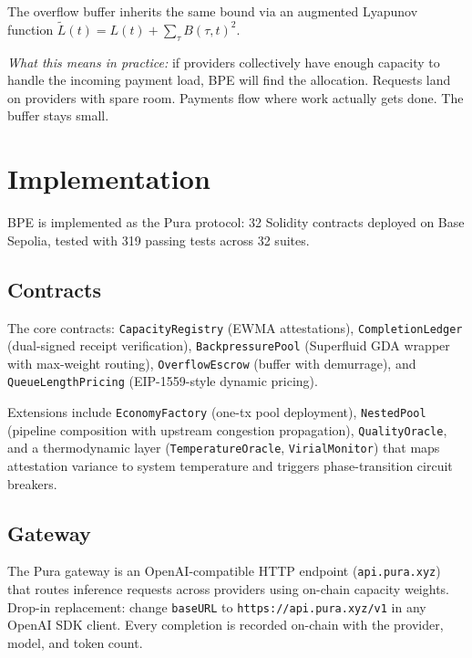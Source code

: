 \documentclass[10pt,twocolumn]{article}
\begin{document}
The overflow buffer inherits the same bound via an augmented Lyapunov function
$\tilde{L}(t) = L(t) + \sum_\tau B(\tau,t)^2$.

\textit{What this means in practice:} if providers collectively have enough
capacity to handle the incoming payment load, BPE will find the allocation.
Requests land on providers with spare room. Payments flow where work actually
gets done. The buffer stays small.


\section{Implementation}

BPE is implemented as the Pura protocol: 32 Solidity contracts deployed on
Base Sepolia, tested with 319 passing tests across 32 suites.

\subsection{Contracts}

The core contracts: \texttt{CapacityRegistry} (EWMA attestations),
\texttt{CompletionLedger} (dual-signed receipt verification),
\texttt{BackpressurePool} (Superfluid GDA wrapper with max-weight routing),
\texttt{OverflowEscrow} (buffer with demurrage), and
\texttt{QueueLengthPricing} (EIP-1559-style dynamic pricing).

Extensions include \texttt{EconomyFactory} (one-tx pool deployment),
\texttt{NestedPool} (pipeline composition with upstream congestion propagation),
\texttt{QualityOracle}, and a thermodynamic layer (\texttt{TemperatureOracle},
\texttt{VirialMonitor}) that maps attestation variance to system temperature
and triggers phase-transition circuit breakers.

\subsection{Gateway}

The Pura gateway is an OpenAI-compatible HTTP endpoint (\texttt{api.pura.xyz})
that routes inference requests across providers using on-chain capacity weights.
Drop-in replacement: change \texttt{baseURL} to \texttt{https://api.pura.xyz/v1}
in any OpenAI SDK client. Every completion is recorded on-chain with the
provider, model, and token count.
\end{document}
